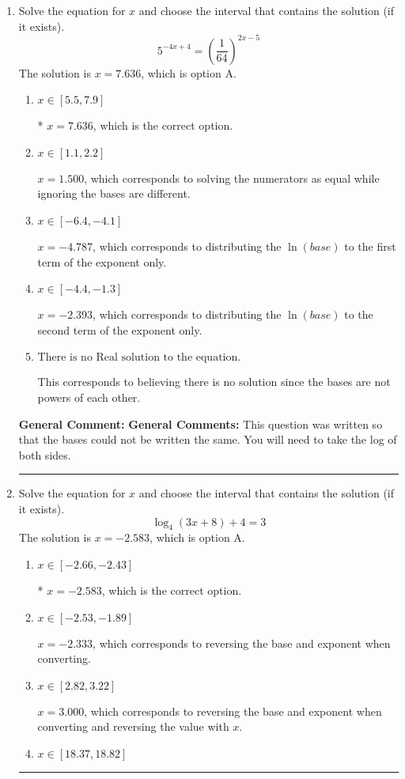 \documentclass{extbook}[14pt]
\newcommand{\litem}[1]{\item #1

\rule{\textwidth}{0.4pt}}
\begin{document}
\begin{enumerate}\litem{
Solve the equation for $x$ and choose the interval that contains the solution (if it exists).
\[ 5^{-4x+4} = \left(\frac{1}{64}\right)^{2x-5} \]The solution is \( x = 7.636 \), which is option A.\begin{enumerate}[label=\Alph*.]
\item \( x \in [5.5, 7.9] \)

* $x = 7.636$, which is the correct option.
\item \( x \in [1.1, 2.2] \)

$x = 1.500$, which corresponds to solving the numerators as equal while ignoring the bases are different.
\item \( x \in [-6.4, -4.1] \)

$x = -4.787$, which corresponds to distributing the $\ln(base)$ to the first term of the exponent only.
\item \( x \in [-4.4, -1.3] \)

$x = -2.393$, which corresponds to distributing the $\ln(base)$ to the second term of the exponent only.
\item \( \text{There is no Real solution to the equation.} \)

This corresponds to believing there is no solution since the bases are not powers of each other.
\end{enumerate}

\textbf{General Comment:} \textbf{General Comments:} This question was written so that the bases could not be written the same. You will need to take the log of both sides.
}
\litem{
Solve the equation for $x$ and choose the interval that contains the solution (if it exists).
\[ \log_{4}{(3x+8)}+4 = 3 \]The solution is \( x = -2.583 \), which is option A.\begin{enumerate}[label=\Alph*.]
\item \( x \in [-2.66, -2.43] \)

* $x = -2.583$, which is the correct option.
\item \( x \in [-2.53, -1.89] \)

$x = -2.333$, which corresponds to reversing the base and exponent when converting.
\item \( x \in [2.82, 3.22] \)

$x = 3.000$, which corresponds to reversing the base and exponent when converting and reversing the value with $x$.
\item \( x \in [18.37, 18.82] \)


\end{enumerate}}
\end{enumerate}
\end{document}
